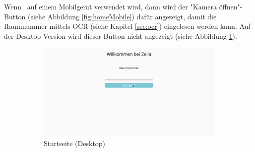 Wenn \ZELIA\ auf einem Mobilgerät verwendet wird, dann wird der "Kamera öffnen"-Button (siehe Abbildung \ref{fig:homeMobile}) dafür angezeigt, damit die Raumnummer mittels OCR (siehe Kapitel \ref{sec:ocr}) eingelesen werden kann. Auf der Desktop-Version wird dieser Button nicht angezeigt (siehe Abbildung \ref{fig:homeDesktop}).

\begin{figure}[H]
    \begin{subfigure}[c]{0.64\textwidth}
        \centering
        \includegraphics[width=\textwidth]{media/ResponsiveDesign/ZeliaHome.png}
        \caption{Startseite (Desktop)}
        \label{fig:homeDesktop}
    \end{subfigure} \hfill
    \begin{subfigure}[c]{0.34\textwidth}
        \centering

\end{subfigure}
\end{figure}

